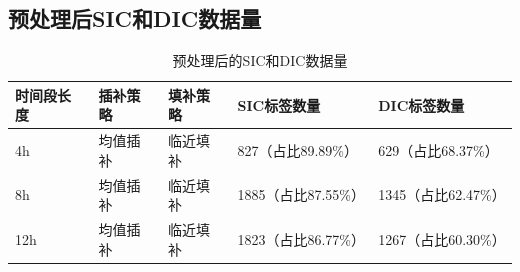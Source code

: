 \documentclass[12pt, a4paper, oneside]{ctexart}
\numberwithin{equation}{section}  %
\begin{document}
\subsection{预处理后SIC和DIC数据量}
\renewcommand\arraystretch{1.2} %
\begin{table}[H] %
    \centering %
    \begin{tabular}{p{}<{\centering}p{}<{\centering}p{}
        p{}p{}} %
        \toprule
        \textbf{时间段长度}&\textbf{插补策略}&\textbf{填补策略}&\textbf{SIC标签数量}&\textbf{DIC标签数量}\\
        \midrule
        4h&均值插补&临近填补&827（占比89.89\%）&629（占比68.37\%）\\
        8h&均值插补&临近填补&1885（占比87.55\%）&1345（占比62.47\%）\\
        12h&均值插补&临近填补&1823（占比86.77\%）&1267（占比60.30\%）\\
        \bottomrule
    \end{tabular}
    \caption{预处理后的SIC和DIC数据量}
    \label{table-sic-dic}
\end{table}
\end{document}
